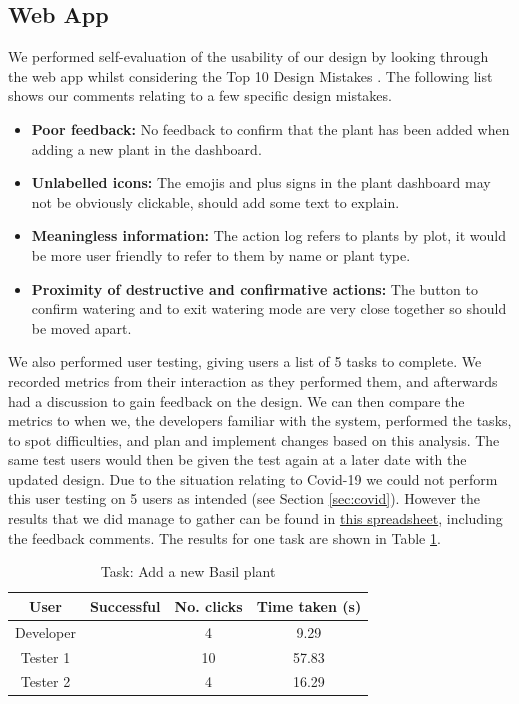 \documentclass{article}
\newcommand{\cmark}{\ding{51}}%
\begin{document}
\subsection{Web App}

We performed self-evaluation of the usability of our design by looking through the web app whilst considering the Top 10 Design Mistakes \cite{NNG}. The following list shows our comments relating to a few specific design mistakes.

\begin{itemize}
    \vspace{-2mm}
    \item \textbf{Poor feedback:} No feedback to confirm that the plant has been added when adding a new plant in the dashboard.
    \item \textbf{Unlabelled icons:} The emojis and plus signs in the plant dashboard may not be obviously clickable, should add some text to explain.
    \item \textbf{Meaningless information:} The action log refers to plants by plot, it would be more user friendly to refer to them by name or plant type.
    \item \textbf{Proximity of destructive and confirmative actions:} The button to confirm watering and to exit watering mode are very close together so should be moved apart.
    \vspace{-3mm}
\end{itemize}
We also performed user testing, giving users a list of 5 tasks to complete. We recorded metrics from their interaction as they performed them, and afterwards had a discussion to gain feedback on the design. We can then compare the metrics to when we, the developers familiar with the system, performed the tasks, to spot difficulties, and plan and implement changes based on this analysis. The same test users would then be given the test again at a later date with the updated design. Due to the situation relating to Covid-19 we could not perform this user testing on 5 users as intended (see Section \ref{sec:covid}). However the results that we did manage to gather can be found in \href{https://docs.google.com/spreadsheets/d/1gcchJ_sqqu5sb6Sjuvxx2aTeRm0q0lLXnITLjnnPLfk/edit?usp=sharing}{this spreadsheet}, including the feedback comments. The results for one task are shown in Table \ref{tab:user-testing}.
\begin{table}[h]
    \centering
    \begin{tabular}{|c|c|c|c|}
    \hline
    User & Successful & No. clicks & Time taken (s) \\
    \hline
    Developer & \cmark & 4 & 9.29   \\
    \hline
    Tester 1  & \cmark & 10 & 57.83    \\
    \hline
    Tester 2  & \cmark & 4 & 16.29    \\
    \hline
    \end{tabular}
    \caption{Task: Add a new Basil plant}
    \label{tab:user-testing}
\end{table}
\end{document}
